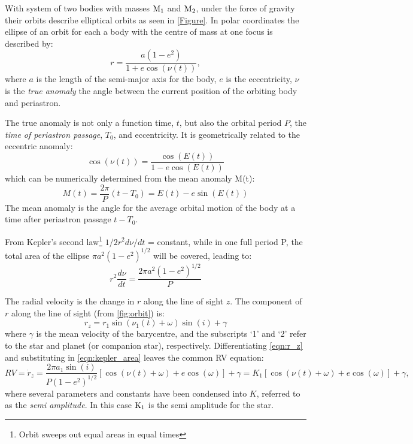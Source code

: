 With system of two bodies with masses $\textrm{M}_{1}$ and $\textrm{M}_{2}$, under the force of gravity their orbits describe elliptical orbits as seen in \cref{Figure}. In polar coordinates the ellipse of an orbit for each a body with the centre of mass at one focus is described by:
\begin{equation}
    r = \frac{a(1-e^{2})}{1 + e \cos(\nu(t))},
\end{equation}
where $a$ is the length of the semi-major axis for the body, $e$ is the eccentricity, $\nu$ is the \emph{true anomaly} the angle between the current position of the orbiting body and periastron.

The true anomaly is not only a function time, \(t\), but also the orbital period \(P\), the \emph{time of periastron passage}, \(T_0\), and eccentricity. It is geometrically related to the eccentric anomaly:
\begin{equation}
\cos(\nu(t)) = \frac{\cos(E(t))}{1 - e \cos(E(t))}
\end{equation} 
which can be numerically determined from the mean anomaly M(t):
\begin{equation}
M(t) = \frac{2 \pi}{P}(t - T_0) = E(t) - e \sin(E(t))
\end{equation}
The mean anomaly is the angle for the average orbital motion of the body at a time after periastron passage \(t-T_0\).


From Kepler's second law\footnote{Orbit sweeps out equal areas in equal times} \(1/2 r^{2} d\nu/dt\) = constant, while in one full period P, the total area of the ellipse \(\pi a^{2}{(1 - e^{2})}^{1/2} \) will be covered, leading to: 
\begin{equation}
r^2 \frac{d\nu}{dt} = \frac{2\pi a^{2}(1-e^{2})^{1/2}}{P} \label{eqn:kepler_area}
\end{equation}

The radial velocity is the change in $r$ along the line of sight $z$. The component of $r$ along the line of sight (from \cref{fig:orbit}) is:
\begin{equation}
   r_z =  r_1 \sin(\nu_1(t) + \omega)\sin(i) + \gamma \label{eqn:r_z}
\end{equation}
where $\gamma$ is the mean velocity of the barycentre, and the subscripts `1' and `2' refer to the star and planet (or companion star), respectively.
Differentiating \cref{eqn:r_z} and substituting in \cref{eqn:kepler_area} leaves the common RV equation:
\begin{equation}
\label{eqn:rv_equation}
{RV} = \dot{r}_z= \frac{2 \pi a_1 \sin(i)}{P{(1-e^{2})}^{1/2}} [\cos{(\nu(t) + \omega)} + e\cos{(\omega)}] + \gamma
     = K_1 [\cos{(\nu(t) + \omega)} + e\cos{(\omega)}] + \gamma,
\end{equation}
where several parameters and constants have been condensed into $K$, referred to as the \emph{semi amplitude}. In this case $\textrm{K}_{1}$ is the semi amplitude for the star.


